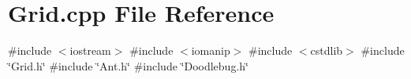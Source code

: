 \section{Grid.\+cpp File Reference}
\label{Grid_8cpp}
{\ttfamily \#include $<$iostream$>$}\newline
{\ttfamily \#include $<$iomanip$>$}\newline
{\ttfamily \#include $<$cstdlib$>$}\newline
{\ttfamily \#include \char`\"{}Grid.\+h\char`\"{}}\newline
{\ttfamily \#include \char`\"{}Ant.\+h\char`\"{}}\newline
{\ttfamily \#include \char`\"{}Doodlebug.\+h\char`\"{}}\newline
